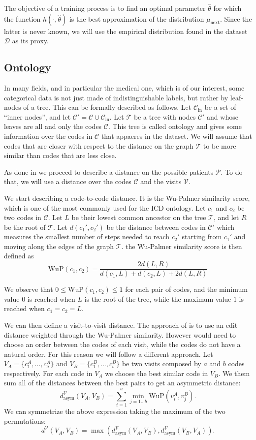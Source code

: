 \documentclass[]{marticle}
\newcommand{\ds}{\mathcal{D}}
\newcommand{\codes}{\mathcal{C}}
\newcommand{\codesin}{\mathcal{C}_\text{in}}
\newcommand{\tree }{\mathcal{T}}
\newcommand{\patients}{\mathcal{P}}
\newcommand{\visits}{\mathcal{V}}
\begin{document}
The objective of a training process is to find an optimal parameter $\hat{\theta}$ for which the
function $h(\cdot, \hat{\theta})$ is the best approximation of the distribution $\mu_\text{next}$. Since the
latter is never known, we will use the empirical distribution found in the dataset $\ds$ as its proxy.

\subsection{Ontology} \label{sect-ontology}

In many fields, and in particular the medical one, which is of our interest, some categorical data
is not just made of indistinguishable labels, but rather by leaf-nodes of a tree. This can be
formally described as follows. Let $\codesin$ be a set of ``inner nodes'', and let $\codes' = \codes
\cup \codesin$. Let $\tree$ be a tree with nodes $\codes'$ and whose leaves are all and only the
codes $\codes$. This tree is called ontology and gives some information over the codes in $\codes$
that appaeres in the dataset. We will assume that codes that are closer with respect to the distance
on the graph $\tree$ to be more similar than codes that are less close.

As done in \cite{panigutti-xai} we proceed to describe a distance on the possible patients $\patients$. To
do that, we will use a distance over the codes $\codes$ and the visits $\visits$.

We start describing a code-to-code distance. It is the Wu-Palmer similarity score, which is one of
the most commonly used for the ICD ontology. Let $c_1$ and $c_2$ be two codes in $\codes$. Let $L$
be their lowest common ancestor on the tree $\tree$, and let $R$ be the root of $\tree$. Let $d(c_1',
c_2')$ be the distance between codes in $\codes'$ which measures the smallest number of steps needed
to reach $c_2'$ starting from $c_1'$ and moving along the edges of the graph $\tree$. the Wu-Palmer
similarity score is then defined as
$$ \text{WuP}(c_1, c_2) = \frac{2 d(L,R)}{d(c_1,L) + d(c_2, L) + 2d(L,R)} $$

We observe that $0 \leq \text{WuP}(c_1, c_2) \leq 1$ for each pair of codes, and the minimum value $0$ is
reached when $L$ is the root of the tree, while the maximum value $1$ is reached when $c_1 = c_2 =
L$.

We can then define a visit-to-visit distance. The approach of \cite{panigutti-xai} is to use an edit
distance weighted through the Wu-Palmer similarity. However would need to choose an order between
the codes of each visit, while the codes do not have a natural order. For this reason we will follow
a different approach. Let $V_A = \{c^A_1, ..., c^A_a\}$ and $V_B = \{c^B_1,..., c^B_b\}$ be two visits
composed by $a$ and $b$ codes respectively. For each code in $V_A$ we choose the best similar code
in $V_B$. We them sum all of the distances between the best pairs to get an asymmetric distance:
$$ d^\visits _\text{asym} (V_A, V_B) = \sum_{i=1}^a \min_{j=1...b} \text{WuP}(v^A_i, v^B_j). $$
We can symmetrize the above expression taking the maximum of the two permutations:
$$ d^\visits  (V_A, V_B) = \max(d^\visits _\text{asym} (V_A, V_B), d^\visits _\text{asym} (V_B, V_A)). $$
\end{document}
